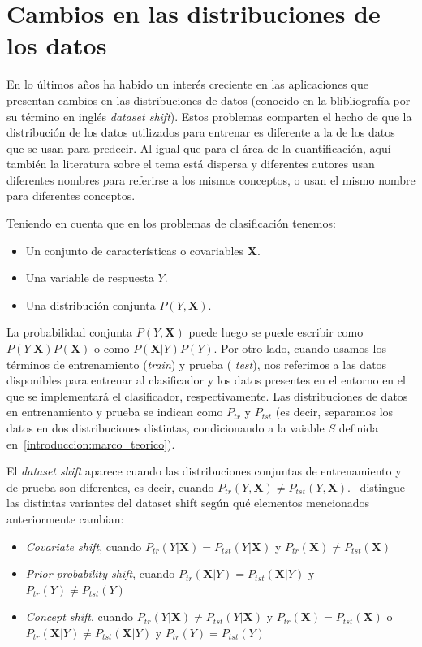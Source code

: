 \section{Cambios en las distribuciones de los datos}\label{problema:cambios}

En lo últimos años ha habido un interés creciente en las aplicaciones que
presentan cambios en las distribuciones de datos (conocido en la blibliografía
por su término en inglés {\it dataset shift\/}). Estos problemas comparten el
hecho de que la distribución de los datos utilizados para entrenar es diferente
a la de los datos que se usan para predecir. Al igual que para el área de la
cuantificación, aquí también la literatura sobre el tema está dispersa y
diferentes autores usan diferentes nombres para referirse a los mismos
conceptos, o usan el mismo nombre para diferentes conceptos.

Teniendo en cuenta que en los problemas de clasificación tenemos:

\begin{itemize}
    \item Un conjunto de características o covariables $\mathbf{X}$.
    \item Una variable de respuesta $Y$.
    \item Una distribución conjunta $P(Y,\mathbf{X})$.
\end{itemize}

La probabilidad conjunta $P(Y,\mathbf{X})$ puede luego se puede escribir como
$P(Y|\mathbf{X})P(\mathbf{X})$ o como $P(\mathbf{X}|Y)P(Y)$. Por otro lado,
cuando usamos los términos de entrenamiento ({\it train\/}) y prueba ({\it
test\/}), nos referimos a las datos disponibles para entrenar al clasificador y
los datos presentes en el entorno en el que se implementará el clasificador,
respectivamente. Las distribuciones de datos en entrenamiento y prueba se
indican como $P_{tr}$ y $P_{tst}$ (es decir, separamos los datos en dos
distribuciones distintas, condicionando a la vaiable $S$ definida
en~\ref{introduccion:marco_teorico}).

El {\it dataset shift\/} aparece cuando las distribuciones conjuntas de
entrenamiento y de prueba son diferentes, es decir, cuando $P_{tr}(Y,\mathbf{X})
\neq P_{tst}(Y,\mathbf{X})$.~\citet{moreno2012unifying} distingue las distintas
variantes del dataset shift según qué elementos mencionados anteriormente
cambian:

\begin{itemize}
    \item {\it Covariate shift}, cuando $P_{tr}(Y|\mathbf{X}) =
    P_{tst}(Y|\mathbf{X})$ y $P_{tr}(\mathbf{X}) \neq P_{tst}(\mathbf{X})$
    \item {\it Prior probability shift}, cuando $P_{tr}(\mathbf{X}|Y) =
    P_{tst}(\mathbf{X}|Y)$ y $P_{tr}(Y) \neq P_{tst}(Y)$
    \item {\it Concept shift}, cuando $P_{tr}(Y|\mathbf{X}) \neq
    P_{tst}(Y|\mathbf{X})$ y $P_{tr}(\mathbf{X}) = P_{tst}(\mathbf{X})$ o
    $P_{tr}(\mathbf{X}|Y) \neq P_{tst}(\mathbf{X}|Y)$ y $P_{tr}(Y) = P_{tst}(Y)$
\end{itemize}

